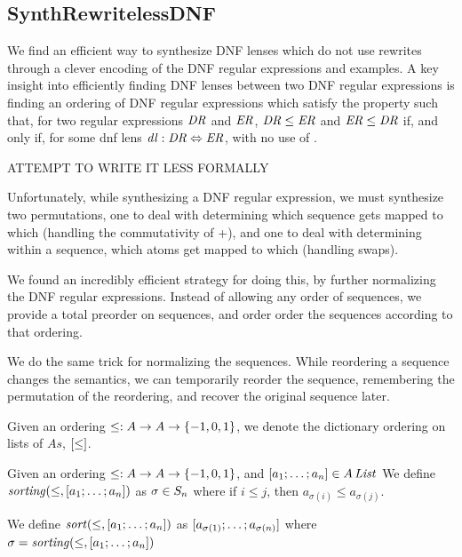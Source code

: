 \documentclass[numbers]{sigplanconf}
\begin{document}
\subsection{SynthRewritelessDNF}
We find an efficient way to synthesize DNF lenses which do not use rewrites
through a clever encoding of the DNF regular expressions and examples.
A key insight into efficiently finding DNF lenses between two DNF regular
expressions is finding an ordering of DNF regular expressions which satisfy the
property such that, for two regular expressions $\mathit{DR}$ and $\mathit{ER}$,
$\mathit{DR} \leq \mathit{ER}$ and $\mathit{ER} \leq \mathit{DR}$ if, and only if,
for some dnf lens $\mathit{dl} : \mathit{DR} \Leftrightarrow \mathit{ER}$,
with no use of \DNFRewriteLensRule{}.

ATTEMPT TO WRITE IT LESS FORMALLY

Unfortunately, while synthesizing a DNF regular expression, we must synthesize
two permutations, one to deal with determining which sequence
gets mapped to which (handling the commutativity of +), and one to deal
with determining within a sequence, which atoms get mapped to which
(handling swaps).

We found an incredibly efficient strategy for doing this, by further normalizing
the DNF regular expressions.  Instead of allowing any order of sequences, we
provide a total preorder on sequences, and order order the sequences
according to that ordering.

We do the same trick for normalizing the sequences.  While reordering a sequence
changes the semantics, we can temporarily reorder the sequence, remembering the
permutation of the reordering, and recover the original sequence later.

\begin{definition}
Given an ordering $\leq : A \rightarrow A \rightarrow \{-1,0,1\}$,
we denote the dictionary ordering on lists of $As$, $[ \leq ]$.
\end{definition}

\begin{definition}
  Given an ordering $\leq : A \rightarrow A \rightarrow \{-1,0,1\}$,
  and $[ a_1;\ldots;a_n ]\in A\,\mathit{List}$
  We define $\mathit{sorting}(\leq,[ a_1;\ldots;a_n ])$ as
  $\sigma \in S_{n}$ where if $i\leq j$,
  then $a_{\sigma(i)} \leq a_{\sigma(j)}$.

  We define $\mathit{sort}(\leq,[ a_1;\ldots;a_n ])$ as
  $[ a_{\sigma(1)};\ldots;a_{\sigma(n)} ]$ where
  $\sigma=\mathit{sorting}(\leq,[ a_1;\ldots;a_n ])$
\end{definition}
\end{document}
